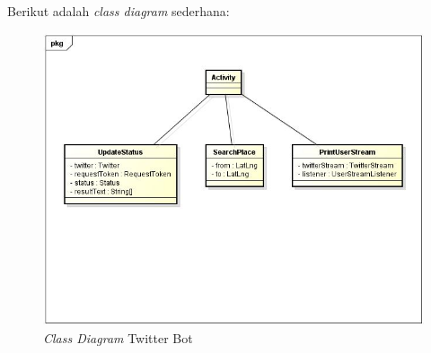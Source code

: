 Berikut adalah \textit{class diagram} sederhana:
\begin{figure}[htbp]
	\centering
		\includegraphics{Gambar/diagramClass.jpg}
	\caption{\textit{Class Diagram} Twitter Bot}
	\label{fig:classdiagram}
\end{figure}